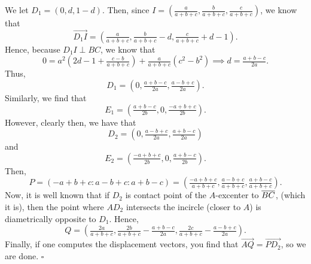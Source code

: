 \documentclass{article}
\begin{document}
We let $D_1 = (0, d, 1-d)$. Then, since $I = \left(\tfrac{a}{a+b+c}, \tfrac{b}{a+b+c}, \tfrac{c}{a+b+c}\right)$, we know that \[\overrightarrow{D_1I} = \left(\tfrac{a}{a+b+c}, \tfrac{b}{a+b+c}-d, \tfrac{c}{a+b+c}+d-1\right).\] Hence, because $D_1I \perp BC$, we know that \[0 = a^2\left(2d-1+\tfrac{c-b}{a+b+c}\right)+\tfrac{a}{a+b+c}(c^2-b^2) \implies d = \tfrac{a+b-c}{2a}.\] Thus, \[D_1 = \left(0, \tfrac{a+b-c}{2a}, \tfrac{a-b+c}{2a}\right).\] Similarly, we find that \[E_1 = \left(\tfrac{a+b-c}{2b}, 0, \tfrac{-a+b+c}{2b}\right).\] However, clearly then, we have that \[D_2 = \left(0, \tfrac{a-b+c}{2a}, \tfrac{a+b-c}{2a}\right)\] and \[E_2 = \left(\tfrac{-a+b+c}{2b}, 0, \tfrac{a+b-c}{2b}\right).\] Then, \[P = \left(-a+b+c : a-b+c : a+b-c\right) = \left(\tfrac{-a+b+c}{a+b+c}, \tfrac{a-b+c}{a+b+c}, \tfrac{a+b-c}{a+b+c}\right).\] Now, it is well known that if $D_2$ is contact point of the $A$-excenter to $\overline{BC}$, (which it is), then the point where $AD_2$ intersects the incircle (closer to $A$) is diametrically opposite to $D_1$. Hence, \[Q = \left(\tfrac{2a}{a+b+c}, \tfrac{2b}{a+b+c}-\tfrac{a+b-c}{2a}, \tfrac{2c}{a+b+c}-\tfrac{a-b+c}{2a}\right).\] Finally, if one computes the displacement vectors, you find that $\overrightarrow{AQ} = \overrightarrow{PD_2}$, so we are done. $\square$
\end{document}
